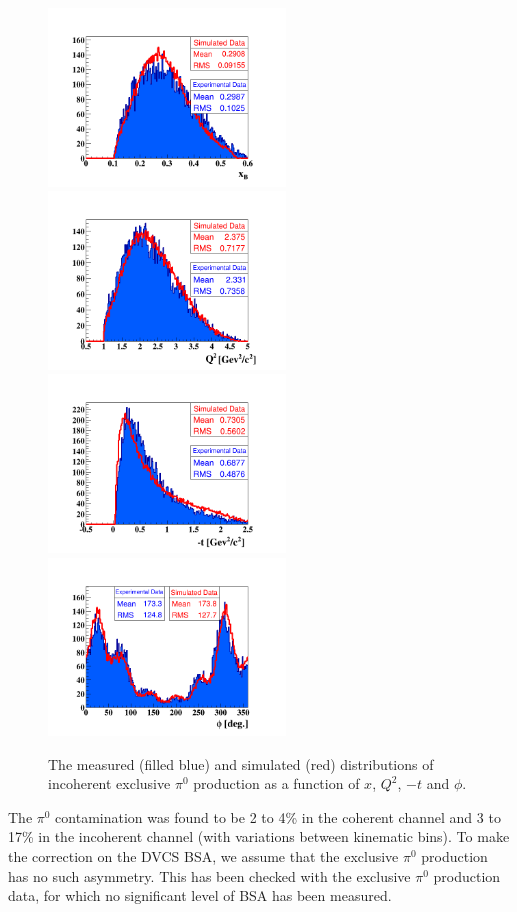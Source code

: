 \documentclass[aps,prc,preprint,superscriptaddress]{revtex4}
\begin{document}
\begin{figure}[p]
\center
\includegraphics[trim=70 15 70 70,clip,width=6.3cm]{fig3/pi0/xB_InCoh_pi0.png}
\includegraphics[trim=70 15 70 70,clip,width=6.3cm]{fig3/pi0/Q2_InCoh_pi0.png}
\includegraphics[trim=70 15 70 70,clip,width=6.3cm]{fig3/pi0/t_InCoh_pi0.png}
\includegraphics[trim=70 15 70 70,clip,width=6.3cm]{fig3/pi0/phi_h_InCoh_pi0.png}
	\caption{The measured (filled blue) and simulated (red) distributions of
	incoherent exclusive $\pi^0$ production as a function of $x$, $Q^2$, $-t$ and $\phi$.}
\label{fig:InCohPi0Simul}
\end{figure}


The $\pi^0$ contamination was found to be 2 to 4\% in the coherent channel and 3 to 17\% in the incoherent
channel (with variations between kinematic bins). To make the correction on the DVCS BSA, we assume that
the exclusive $\pi^0$ production has no such asymmetry. This has been checked with the exclusive 
$\pi^0$ production data, for which no significant level of BSA has been measured.
\end{document}
